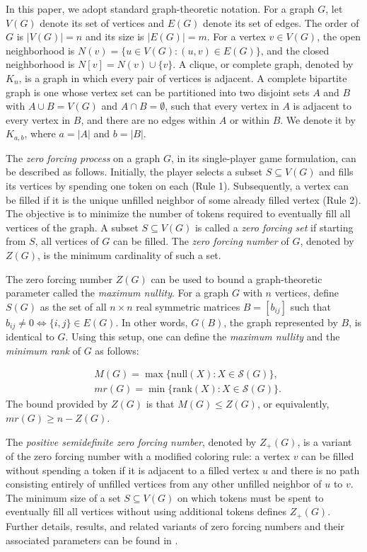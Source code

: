 \documentclass[11pt]{article}
\theoremstyle{plain}
\theoremstyle{definition}
\theoremstyle{remark}
\begin{document}
In this paper, we adopt standard graph-theoretic notation. For a graph $G$, let $V(G)$ denote its set of vertices and $E(G)$ denote its set of edges. The order of $G$ is $|V(G)|=n$ and its size is $|E(G)|=m$. For a vertex $v \in V(G)$, the open neighborhood is $N(v) = \{u \in V(G) : (u,v) \in E(G)\}$, and the closed neighborhood is $N[v] = N(v) \cup \{v\}$. A clique, or complete graph, denoted by $K_n$, is a graph in which every pair of vertices is adjacent. A complete bipartite graph is one whose vertex set can be partitioned into two disjoint sets $A$ and $B$ with $A \cup B = V(G)$ and $A \cap B = \emptyset$, such that every vertex in $A$ is adjacent to every vertex in $B$, and there are no edges within $A$ or within $B$. We denote it by $K_{a,b}$, where $a = |A|$ and $b = |B|$.

The \emph{zero forcing process} on a graph $G$, in its single-player game formulation, can be described as follows. Initially, the player selects a subset $S \subseteq V(G)$ and fills its vertices by spending one token on each (Rule 1). Subsequently, a vertex can be filled if it is the unique unfilled neighbor of some already filled vertex (Rule 2). The objective is to minimize the number of tokens required to eventually fill all vertices of the graph. A subset $S \subseteq V(G)$ is called a \emph{zero forcing set} if starting from $S$, all vertices of $G$ can be filled. The \emph{zero forcing number} of $G$, denoted by $Z(G)$, is the minimum cardinality of such a set.

The zero forcing number $Z(G)$ can be used to bound a graph-theoretic parameter called the \emph{maximum nullity}. For a graph $G$ with $n$ vertices, define $S(G)$ as the set of all $n \times n$ real symmetric matrices $B = [b_{ij}]$ such that $b_{ij} \neq 0 \Leftrightarrow \{i,j\}\in E(G)$. In other words, $G(B)$, the graph represented by $B$, is identical to $G$. Using this setup, one can define the \emph{maximum nullity} and the \emph{minimum rank} of $G$ as follows:

\vspace{-0.1cm}
\begin{align*}
   & M (G) = \max \{\text{null}(X):  X\in \mathcal{S}(G)\},\\
   & mr (G) = \min\{\text{rank}(X): X \in \mathcal{S}(G)\}.
\end{align*}
The bound provided by $Z(G)$ is that $M(G) \leq Z(G)$, or equivalently, $mr(G) \geq n-Z(G)$.
 

The \emph{positive semidefinite zero forcing number}, denoted by $Z_{+}(G)$, is a variant of the zero forcing number with a modified coloring rule: a vertex $v$ can be filled without spending a token if it is adjacent to a filled vertex $u$ and there is no path consisting entirely of unfilled vertices from any other unfilled neighbor of $u$ to $v$. The minimum size of a set $S \subseteq V(G)$ on which tokens must be spent to eventually fill all vertices without using additional tokens defines $Z_+(G)$. Further details, results, and related variants of zero forcing numbers and their associated parameters can be found in \cite[Chapters 2 \& 7--10]{hogben2022inverse}.
\end{document}
